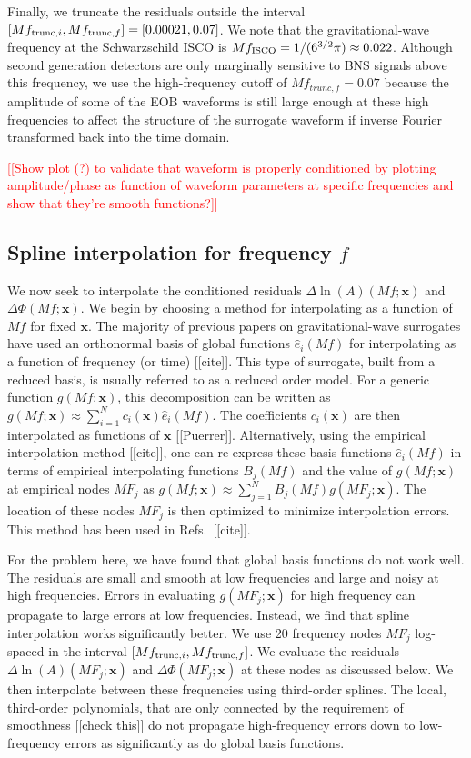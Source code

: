 \documentclass[prd,aps,letter,twocolumn,floatfix,notitlepage,nofootinbib]{revtex4-1}
\def\bx{\mathbf{x}}
\newcommand{\red}[1]{\textcolor{red}{#1}}
\begin{document}
Finally, we truncate the residuals outside the interval $[Mf_{{\rm trunc}, i}, Mf_{{\rm trunc}, f}] = [0.00021, 0.07]$. We note that the gravitational-wave frequency at the Schwarzschild ISCO is $Mf_{\rm ISCO} = 1/(6^{3/2}\pi) \approx 0.022$. Although second generation detectors are only marginally sensitive to BNS signals above this frequency, we use the high-frequency cutoff of $Mf_{trunc,f}=0.07$ because the amplitude of some of the EOB waveforms is still large enough at these high frequencies to affect the structure of the surrogate waveform if inverse Fourier transformed back into the time domain.

\red{[[Show plot (?) to validate that waveform is properly conditioned by plotting amplitude/phase as function of waveform parameters at specific frequencies and show that they're smooth functions?]]}


\subsection{Spline interpolation for frequency $f$}

We now seek to interpolate the conditioned residuals $\Delta\ln(A)(Mf; \bx)$ and $\Delta\Phi(Mf; \bx)$. We begin by choosing a method for interpolating as a function of $Mf$ for fixed $\bx$. The majority of previous papers on gravitational-wave surrogates have used an orthonormal basis of global functions $\hat e_i(Mf)$ for interpolating as a function of frequency (or time) [[cite]]. This type of surrogate, built from a reduced basis, is usually referred to as a reduced order model. For a generic function $g(Mf; \bx)$, this decomposition can be written as $g(Mf; \bx) \approx \sum_{i=1}^N c_i(\bx) \hat e_i(Mf)$. The coefficients $c_i(\bx)$ are then interpolated as functions of $\bx$ [[Puerrer]]. Alternatively, using the empirical interpolation method [[cite]], one can re-express these basis functions $\hat e_i(Mf)$ in terms of empirical interpolating functions $B_j(Mf)$ and the value of $g(Mf; \bx)$ at empirical nodes $MF_j$ as $g(Mf; \bx) \approx \sum_{j=1}^N B_j(Mf) g(MF_j; \bx)$. The location of these nodes $MF_j$ is then optimized to minimize interpolation errors. This method has been used in Refs.~[[cite]].

For the problem here, we have found that global basis functions do not work well. The residuals are small and smooth at low frequencies and large and noisy at high frequencies. Errors in evaluating $g(MF_j;\bx)$ for high frequency can propagate to large errors at low frequencies. Instead, we find that spline interpolation works significantly better. We use 20 frequency nodes $MF_j$ log-spaced in the interval $[Mf_{{\rm trunc}, i}, Mf_{{\rm trunc}, f}]$. We evaluate the residuals $\Delta\ln(A)(MF_j; \bx)$ and $\Delta\Phi(MF_j; \bx)$ at these nodes as discussed below. We then interpolate between these frequencies using third-order splines. The local, third-order polynomials, that are only connected by the requirement of smoothness [[check this]] do not propagate high-frequency errors down to low-frequency errors as significantly as do global basis functions.
\end{document}
